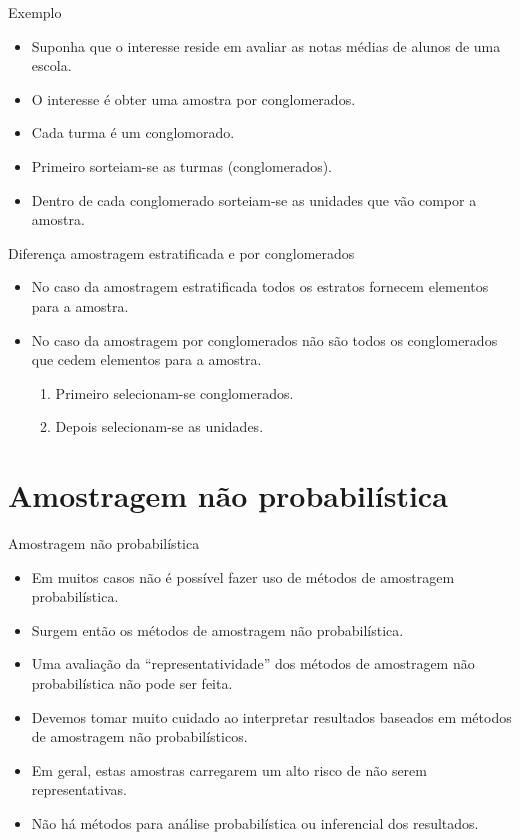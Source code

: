\documentclass[
  ignorenonframetext,
  serif,
  professionalfont,
  usenames,
  dvipsnames,
  aspectratio = 169]{beamer}
\providecommand{\tightlist}{%
  \setlength{\itemsep}{0pt}\setlength{\parskip}{0pt}}
\renewcommand{\tightlist}{%
  \setlength{\itemsep}{0\baselineskip}
  \setlength{\parskip}{0.25\baselineskip}
}
\begin{document}
\begin{frame}{Exemplo}
\protect\hypertarget{exemplo-3}{}
\begin{itemize}
\item
  Suponha que o interesse reside em avaliar as notas médias de alunos de
  uma escola.
\item
  O interesse é obter uma amostra por conglomerados.
\item
  Cada turma é um conglomorado.
\item
  Primeiro sorteiam-se as turmas (conglomerados).
\item
  Dentro de cada conglomerado sorteiam-se as unidades que vão compor a
  amostra.
\end{itemize}
\end{frame}

\begin{frame}{Diferença amostragem estratificada e por conglomerados}
\protect\hypertarget{diferenuxe7a-amostragem-estratificada-e-por-conglomerados}{}
\begin{itemize}
\item
  No caso da amostragem estratificada todos os estratos fornecem
  elementos para a amostra.
\item
  No caso da amostragem por conglomerados não são todos os conglomerados
  que cedem elementos para a amostra.

  \begin{enumerate}
  \tightlist
  \item
    Primeiro selecionam-se conglomerados.
  \item
    Depois selecionam-se as unidades.
  \end{enumerate}
\end{itemize}
\end{frame}

\hypertarget{amostragem-nuxe3o-probabiluxedstica}{%
\section{Amostragem não
probabilística}\label{amostragem-nuxe3o-probabiluxedstica}}

\begin{frame}{Amostragem não probabilística}
\protect\hypertarget{amostragem-nuxe3o-probabiluxedstica-1}{}
\begin{itemize}
\item
  Em muitos casos não é possível fazer uso de métodos de amostragem
  probabilística.
\item
  Surgem então os métodos de amostragem não probabilística.
\item
  Uma avaliação da ``representatividade'' dos métodos de amostragem não
  probabilística não pode ser feita.
\item
  Devemos tomar muito cuidado ao interpretar resultados baseados em
  métodos de amostragem não probabilísticos.
\item
  Em geral, estas amostras carregarem um alto risco de não serem
  representativas.
\item
  Não há métodos para análise probabilística ou inferencial dos
  resultados.
\end{itemize}
\end{frame}
\end{document}
